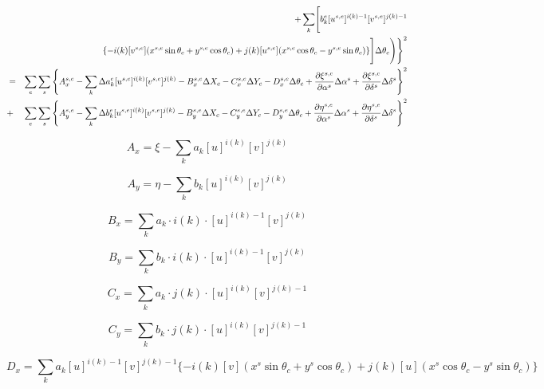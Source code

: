 \documentclass[12pt]{article}
\begin{document}
{\begin{eqnarray}
&  & \hspace{1.0cm}+ \sum_k \Biggr[ b_k^e [u^{s,e}]^{i(k)-1} [v^{s,e}]^{j(k)-1}  \nonumber \\
& & \hspace{1.0cm} \{-i(k)[v^{s,e}](x^{s,e}\sin\theta_c+y^{s,e}\cos\theta_c)+j(k)[u^{s,e}](x^{s,e}\cos\theta_c-y^{s,e}\sin\theta_c) \} \Biggl] \Delta \theta_c \Biggr) \Biggr\}^2 \\
& = & \sum_e \sum_s \left\{ A_x^{s,e} - \sum_k \Delta a_k^e [u^{s,e}]^{i(k)} [v^{s,e}]^{j(k)} - B_x^{s,e} \Delta X_c - C_x^{s,e} \Delta Y_c -D_x^{s,e} \Delta\theta_c + \frac{\partial \xi^{s,e}}{\partial \alpha^{s}} \Delta\alpha^{s} + \frac{\partial \xi^{s,e}}{\partial \delta^{s}} \Delta\delta^{s} \right\}^2 \nonumber \\
& + & \sum_e \sum_s \left\{ A_y^{s,e} - \sum_k \Delta b_k^e [u^{s,e}]^{i(k)} [v^{s,e}]^{j(k)} - B_y^{s,e} \Delta X_c - C_y^{s,e} \Delta Y_c -D_y^{s,e} \Delta\theta_c + \frac{\partial \eta^{s,e}}{\partial \alpha^{s}} \Delta\alpha^{s} + \frac{\partial \eta^{s,e}}{\partial \delta^{s}} \Delta\delta^{s} \right\}^2 \nonumber \\
\end{eqnarray}

\begin{equation}
A_x = \xi - \sum_k a_k [u]^{i(k)} [v]^{j(k)}
\end{equation}

\begin{equation}
A_y = \eta - \sum_k b_k [u]^{i(k)} [v]^{j(k)}
\end{equation}

\begin{equation}
B_x = \sum_k a_k \cdot i(k) \cdot [u]^{i(k)-1} [v]^{j(k)}
\end{equation}

\begin{equation}
B_y = \sum_k b_k \cdot i(k) \cdot [u]^{i(k)-1} [v]^{j(k)}
\end{equation}

\begin{equation}
C_x = \sum_k a_k \cdot j(k) \cdot [u]^{i(k)} [v]^{j(k)-1}
\end{equation}

\begin{equation}
C_y = \sum_k b_k \cdot j(k) \cdot [u]^{i(k)} [v]^{j(k)-1}
\end{equation}

\begin{equation}
D_x = \sum_k a_k [u]^{i(k)-1} [v]^{j(k)-1} \{-i(k)[v](x^s\sin\theta_c+y^s\cos\theta_c)+j(k)[u](x^s\cos\theta_c-y^s\sin\theta_c) \} 
\end{equation}

}
\end{document}
